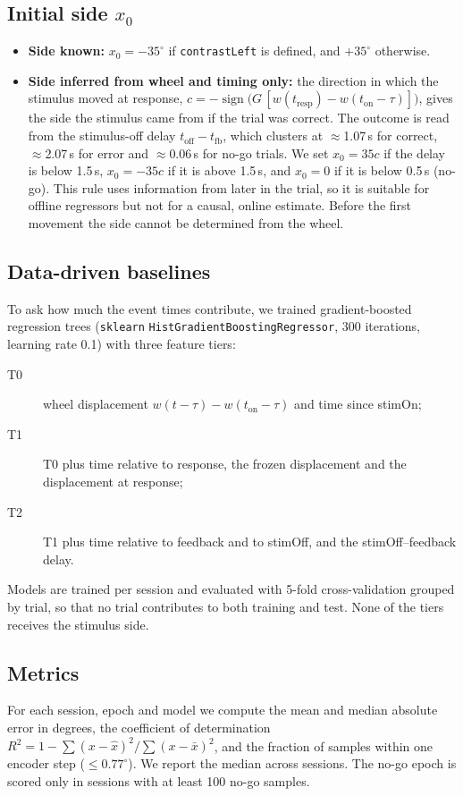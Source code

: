 \documentclass[11pt,a4paper]{article}
\begin{document}
\subsection{Initial side \texorpdfstring{$x_0$}{x0}}
\begin{itemize}
\item \textbf{Side known:} $x_0=-35^\circ$ if \texttt{contrastLeft} is defined, and $+35^\circ$ otherwise.
\item \textbf{Side inferred from wheel and timing only:} the direction in which the stimulus moved at
response, $c=-\operatorname{sign}\bigl(G\,[w(t_\mathrm{resp})-w(t_\mathrm{on}-\tau)]\bigr)$, gives the side
the stimulus came from if the trial was correct. The outcome is read from the stimulus-off delay
$t_\mathrm{off}-t_\mathrm{fb}$, which clusters at $\approx$1.07\,s for correct, $\approx$2.07\,s for error and
$\approx$0.06\,s for no-go trials. We set $x_0=35c$ if the delay is below 1.5\,s, $x_0=-35c$ if it is above
1.5\,s, and $x_0=0$ if it is below 0.5\,s (no-go). This rule uses information from later in the trial, so it
is suitable for offline regressors but not for a causal, online estimate. Before the first movement the side
cannot be determined from the wheel.
\end{itemize}

\subsection{Data-driven baselines}
To ask how much the event times contribute, we trained gradient-boosted regression trees
(\texttt{sklearn} \texttt{HistGradientBoostingRegressor}, 300 iterations, learning rate 0.1) with three
feature tiers:
\begin{description}
\item[T0] wheel displacement $w(t-\tau)-w(t_\mathrm{on}-\tau)$ and time since stimOn;
\item[T1] T0 plus time relative to response, the frozen displacement and the displacement at response;
\item[T2] T1 plus time relative to feedback and to stimOff, and the stimOff--feedback delay.
\end{description}
Models are trained per session and evaluated with 5-fold cross-validation grouped by trial, so that no trial
contributes to both training and test. None of the tiers receives the stimulus side.

\subsection{Metrics}
For each session, epoch and model we compute the mean and median absolute error in degrees, the coefficient
of determination $R^2 = 1-\sum(x-\hat x)^2/\sum(x-\bar x)^2$, and the fraction of samples within one encoder
step ($\le0.77^\circ$). We report the median across sessions. The no-go epoch is scored only in sessions with
at least 100 no-go samples.
\end{document}
